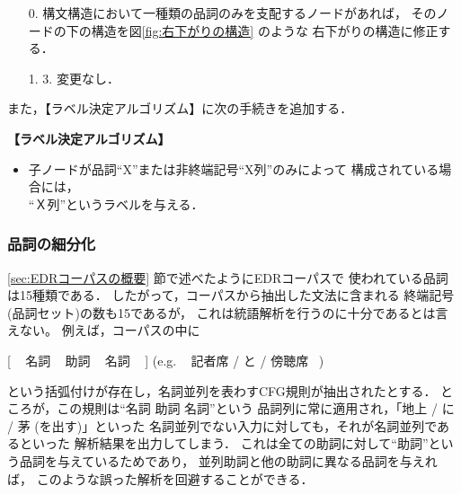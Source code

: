 \begin{itemize}
\item[0.]
  構文構造において一種類の品詞のみを支配するノードがあれば，
  そのノードの下の構造を図\ref{fig:右下がりの構造} のような
  右下がりの構造に修正する．

\item[1.]  3. \hspace{5mm} 変更なし．
\end{itemize}

\bigskip
\noindent
また，【ラベル決定アルゴリズム】に次の手続きを追加する．
\begin{flushleft}
  {\bf 【ラベル決定アルゴリズム】}
  \vspace*{-3mm}
\end{flushleft}

\begin{itemize}
\item
  子ノードが品詞``X''または非終端記号``X列''のみによって
  構成されている場合には，\\
  ``Ｘ列''というラベルを与える．
\end{itemize}

\subsubsection{品詞の細分化}


\ref{sec:EDRコーパスの概要} 節で述べたようにEDRコーパスで
使われている品詞は15種類である．
したがって，コーパスから抽出した文法に含まれる
終端記号(品詞セット)の数も15であるが，
これは統語解析を行うのに十分であるとは言えない。
例えば，コーパスの中に
\begin{center}
  [ ~ 名詞 ~ 助詞 ~ 名詞 ~ ] \qquad (e.g. ~ 記者席 / と / 傍聴席 ~)
\end{center}
という括弧付けが存在し，名詞並列を表わすCFG規則が抽出されたとする．
ところが，この規則は``名詞 助詞 名詞''という
品詞列に常に適用され，「地上 / に / 茅 (を出す)」といった
名詞並列でない入力に対しても，それが名詞並列であるといった
解析結果を出力してしまう．
これは全ての助詞に対して``助詞''という品詞を与えているためであり，
並列助詞と他の助詞に異なる品詞を与えれば，
このような誤った解析を回避することができる．

